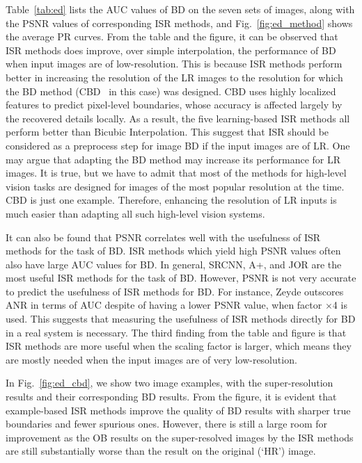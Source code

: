\documentclass[10pt,twocolumn,letterpaper]{article}
\begin{document}

Table~\ref{tab:ed} lists the AUC values of BD on the seven sets of images, along with the PSNR values of corresponding ISR methods, and Fig.~\ref{fig:ed_method} shows the average PR curves. From the table and the figure, it can be observed that ISR methods does improve, over simple interpolation, the performance of BD when input images are of low-resolution. This is because ISR methods perform better in increasing the resolution of the LR images to the resolution for which the BD method (CBD~\cite{isola2014crisp} in this case) was designed. CBD uses highly localized features to predict pixel-level boundaries, whose accuracy is affected largely by the recovered details locally. As a result, the five learning-based ISR methods all perform better than Bicubic Interpolation. 
This suggest that ISR should be considered as a preprocess step for image BD if the input images are of LR. One may argue that adapting the BD method may increase its performance for LR images. It is true, but we have to admit that most of the methods for high-level vision tasks are designed for images of the most popular resolution at the time. CBD is just one example. Therefore, enhancing the resolution of LR inputs is much easier than adapting all such high-level vision systems.  

It can also be found that PSNR correlates well with the usefulness of ISR methods for the task of BD. ISR methods which yield high PSNR values often also have large AUC values for BD. In general, SRCNN, A+, and JOR are the most useful ISR methods for the task of BD. However,  PSNR is not very accurate to predict the usefulness of ISR methods for BD.   
For instance, Zeyde \etal outscores ANR in terms of AUC despite of having a lower PSNR value, when factor $\times$4 is used. This suggests that measuring the usefulness of ISR methods directly for BD in a real system is necessary. 
The third finding from the table and figure is that ISR methods are more useful when the scaling factor is larger, which means they are mostly needed when the input images are of very low-resolution.  

In Fig.~\ref{fig:ed_cbd}, we show two image examples, with the super-resolution results and their corresponding BD results. From the figure, it is evident that example-based ISR methods improve the quality of BD results with sharper true boundaries and fewer spurious ones. However, there is still a large room for improvement as the OB results on the super-resolved images by the ISR methods are still substantially worse than the result on the original (`HR') image.       
\end{document}
